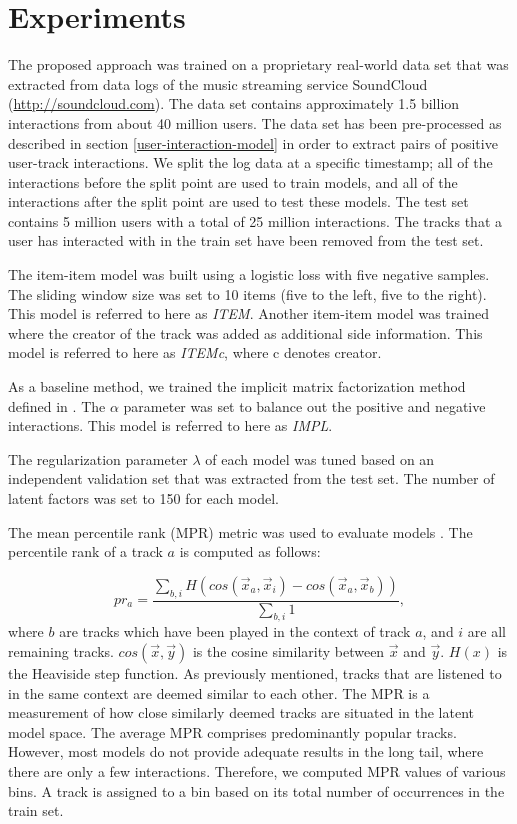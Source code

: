 \documentclass[twocolumn]{article}
\begin{document}
\section{Experiments}

The proposed approach was trained on a proprietary real-world data set that was extracted from data logs of the music streaming service SoundCloud (\url{http://soundcloud.com}). The data set contains approximately 1.5 billion interactions from about 40 million users. The data set has been pre-processed as described in section \ref{user-interaction-model} in order to extract pairs of positive user-track interactions. We split the log data at a specific timestamp; all of the interactions before the split point are used to train models, and all of the interactions after the split point are used to test these models. The test set contains 5 million users with a total of 25 million interactions. The tracks that a user has interacted with in the train set have been removed from the test set.

The item-item model was built using a logistic loss with five negative samples. The sliding window size was set to 10 items (five to the left, five to the right). This model is referred to here as \textit{ITEM}.
Another item-item model was trained where the creator of the track was added as additional side information. This model is referred to here as \textit{ITEMc}, where c denotes creator.

As a baseline method, we trained the implicit matrix factorization method defined in \cite{implicit-factorization}. The $\alpha$ parameter was set to balance out the positive and negative interactions. This model is referred to here as \textit{IMPL}.

The regularization parameter $\lambda$ of each model was tuned based on an independent validation set that was extracted from the test set. The number of latent factors was set to 150 for each model.

The mean percentile rank (MPR) metric was used to evaluate models \cite{implicit-factorization}. The percentile rank of a track $a$ is computed as follows:

\begin{equation}
	pr_a = \frac{\sum_{b,i} H(cos(\vec{x}_a,\vec{x}_i) - cos(\vec{x}_a,\vec{x}_b))}{\sum_{b,i} 1},
\end{equation}
where $b$ are tracks which have been played in the context of track $a$, and $i$ are all remaining tracks. $cos(\vec{x}, \vec{y})$ is the cosine similarity between $\vec{x}$ and $\vec{y}$. $H(x)$ is the Heaviside step function. As previously mentioned, tracks that are listened to in the same context are deemed similar to each other. The MPR is a measurement of how close similarly deemed tracks are situated in the latent model space.
The average MPR comprises predominantly popular tracks. However, most models do not provide adequate results in the long tail, where there are only a few interactions. Therefore, we computed MPR values of various bins. A track is assigned to a bin based on its total number of occurrences in the train set.
\end{document}
